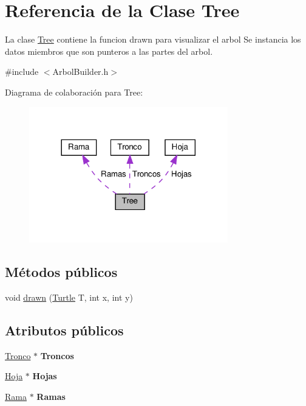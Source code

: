 \hypertarget{classTree}{}\section{Referencia de la Clase Tree}
\label{classTree}


La clase \hyperlink{classTree}{Tree} contiene la funcion drawn para visualizar el arbol  Se instancia los datos miembros que son punteros a las partes del arbol.  




{\ttfamily \#include $<$Arbol\+Builder.\+h$>$}



Diagrama de colaboración para Tree\+:\nopagebreak
\begin{figure}[H]
\begin{center}
\leavevmode
\includegraphics[width=245pt]{classTree__coll__graph}
\end{center}
\end{figure}
\subsection*{Métodos públicos}
\begin{DoxyCompactItemize}
\item 
void \hyperlink{classTree_aeb680a32bf1743d52cf63da53712dc7d}{drawn} (\hyperlink{classTurtle}{Turtle} T, int x, int y)
\end{DoxyCompactItemize}
\subsection*{Atributos públicos}
\begin{DoxyCompactItemize}
\item 
\mbox{\label{classTree_a96e70d44324ad226b6a7fc1576ee7554}} 
\hyperlink{classTronco}{Tronco} $\ast$ {\bfseries Troncos}
\item 
\mbox{\label{classTree_a8651c39bf1509dca86eb9fdd872581e0}} 
\hyperlink{classHoja}{Hoja} $\ast$ {\bfseries Hojas}
\item 
\mbox{\label{classTree_a61e6de64e4f19bcf92f3c1cff9f17441}} 
\hyperlink{classRama}{Rama} $\ast$ {\bfseries Ramas}
\end{DoxyCompactItemize}


